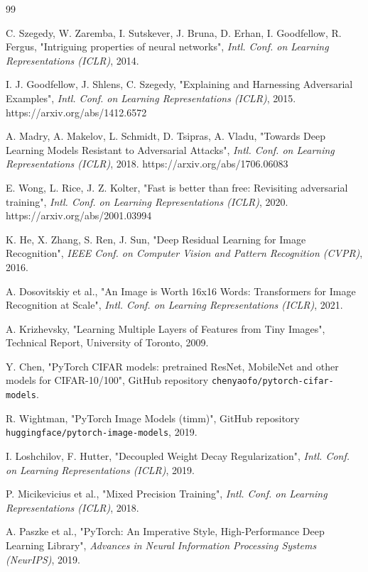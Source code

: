 \documentclass[a4paper,11pt]{article}
\begin{document}
\begin{thebibliography}{99}

C. Szegedy, W. Zaremba, I. Sutskever, J. Bruna, D. Erhan, I. Goodfellow,
R. Fergus, "Intriguing properties of neural networks",
{\em Intl. Conf. on Learning Representations (ICLR)}, 2014.

I. J. Goodfellow, J. Shlens, C. Szegedy, "Explaining and Harnessing
Adversarial Examples", {\em Intl. Conf. on Learning Representations
(ICLR)}, 2015. https://arxiv.org/abs/1412.6572

A. Madry, A. Makelov, L. Schmidt, D. Tsipras, A. Vladu, "Towards Deep
Learning Models Resistant to Adversarial Attacks", {\em Intl. Conf. on
Learning Representations (ICLR)}, 2018. https://arxiv.org/abs/1706.06083

E. Wong, L. Rice, J. Z. Kolter, "Fast is better than free: Revisiting
adversarial training", {\em Intl. Conf. on Learning Representations
(ICLR)}, 2020. https://arxiv.org/abs/2001.03994

K. He, X. Zhang, S. Ren, J. Sun, "Deep Residual Learning for Image
Recognition", {\em IEEE Conf. on Computer Vision and Pattern Recognition
(CVPR)}, 2016.

A. Dosovitskiy et al., "An Image is Worth 16x16 Words: Transformers for
Image Recognition at Scale", {\em Intl. Conf. on Learning Representations
(ICLR)}, 2021.

A. Krizhevsky, "Learning Multiple Layers of Features from Tiny Images",
Technical Report, University of Toronto, 2009.

Y. Chen, "PyTorch CIFAR models: pretrained ResNet, MobileNet and other
models for CIFAR-10/100", GitHub repository
\texttt{chenyaofo/pytorch-cifar-models}.

R. Wightman, "PyTorch Image Models (timm)", GitHub repository
\texttt{huggingface/pytorch-image-models}, 2019.

I. Loshchilov, F. Hutter, "Decoupled Weight Decay Regularization",
{\em Intl. Conf. on Learning Representations (ICLR)}, 2019.

P. Micikevicius et al., "Mixed Precision Training", {\em Intl. Conf. on
Learning Representations (ICLR)}, 2018.

A. Paszke et al., "PyTorch: An Imperative Style, High-Performance Deep
Learning Library", {\em Advances in Neural Information Processing Systems
(NeurIPS)}, 2019.

\end{thebibliography}
\end{document}
